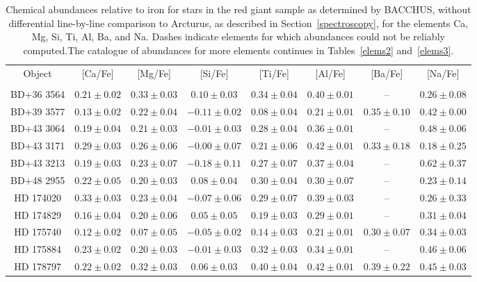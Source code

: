 \begin{table*}
\caption{Chemical abundances relative to iron for stars in the red giant sample as determined by BACCHUS, without differential line-by-line comparison to Arcturus, as described in Section~\ref{spectroscopy}, for the elements Ca, Mg, Si, Ti, Al, Ba, and Na. Dashes indicate elements for which abundances could not be reliably computed.The catalogue of abundances for more elements continues in Tables~\ref{elems2} and~\ref{elems3}.\label{elems1}}
\begin{tabular}{cccccccc}
\hline \hline
Object & [Ca/Fe] & [Mg/Fe] & [Si/Fe] & [Ti/Fe] & [Al/Fe] & [Ba/Fe] & [Na/Fe] \\
 &  &  &  &  &  &  &  \\
\hline
BD+36 3564 & $0.21 \pm 0.02$ & $0.33 \pm 0.03$ & $0.10 \pm 0.03$ & $0.34 \pm 0.04$ & $0.40 \pm 0.01$ & -- & $0.26 \pm 0.08$ \\
BD+39 3577 & $0.13 \pm 0.02$ & $0.22 \pm 0.04$ & $-0.11 \pm 0.02$ & $0.08 \pm 0.04$ & $0.21 \pm 0.01$ & $0.35 \pm 0.10$ & $0.42 \pm 0.00$ \\
BD+43 3064 & $0.19 \pm 0.04$ & $0.21 \pm 0.03$ & $-0.01 \pm 0.03$ & $0.28 \pm 0.04$ & $0.36 \pm 0.01$ & -- & $0.48 \pm 0.06$ \\
BD+43 3171 & $0.29 \pm 0.03$ & $0.26 \pm 0.06$ & $-0.00 \pm 0.07$ & $0.21 \pm 0.06$ & $0.42 \pm 0.01$ & $0.33 \pm 0.18$ & $0.18 \pm 0.25$ \\
BD+43 3213 & $0.19 \pm 0.03$ & $0.23 \pm 0.07$ & $-0.18 \pm 0.11$ & $0.27 \pm 0.07$ & $0.37 \pm 0.04$ & -- & $0.62 \pm 0.37$ \\
BD+48 2955 & $0.22 \pm 0.05$ & $0.20 \pm 0.03$ & $0.08 \pm 0.04$ & $0.30 \pm 0.04$ & $0.30 \pm 0.07$ & -- & $0.23 \pm 0.14$ \\
HD 174020 & $0.33 \pm 0.03$ & $0.23 \pm 0.04$ & $-0.07 \pm 0.06$ & $0.29 \pm 0.07$ & $0.39 \pm 0.03$ & -- & $0.26 \pm 0.33$ \\
HD 174829 & $0.16 \pm 0.04$ & $0.20 \pm 0.06$ & $0.05 \pm 0.05$ & $0.19 \pm 0.03$ & $0.29 \pm 0.01$ & -- & $0.31 \pm 0.04$ \\
HD 175740 & $0.12 \pm 0.02$ & $0.07 \pm 0.05$ & $-0.05 \pm 0.02$ & $0.14 \pm 0.03$ & $0.21 \pm 0.01$ & $0.30 \pm 0.07$ & $0.34 \pm 0.03$ \\
HD 175884 & $0.23 \pm 0.02$ & $0.20 \pm 0.03$ & $-0.01 \pm 0.03$ & $0.32 \pm 0.03$ & $0.34 \pm 0.01$ & -- & $0.46 \pm 0.06$ \\
HD 178797 & $0.22 \pm 0.02$ & $0.32 \pm 0.03$ & $0.06 \pm 0.03$ & $0.40 \pm 0.04$ & $0.42 \pm 0.01$ & $0.39 \pm 0.22$ & $0.45 \pm 0.03$ \\

\end{tabular}
\end{table*}
